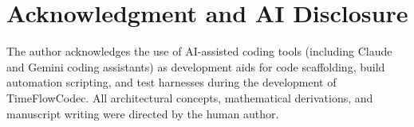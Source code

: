 \documentclass[conference]{IEEEtran}
\begin{document}
\section*{Acknowledgment and AI Disclosure}
The author acknowledges the use of AI-assisted coding tools (including Claude and Gemini coding assistants) as development aids for code scaffolding, build automation scripting, and test harnesses during the development of TimeFlowCodec. All architectural concepts, mathematical derivations, and manuscript writing were directed by the human author.



\end{document}
